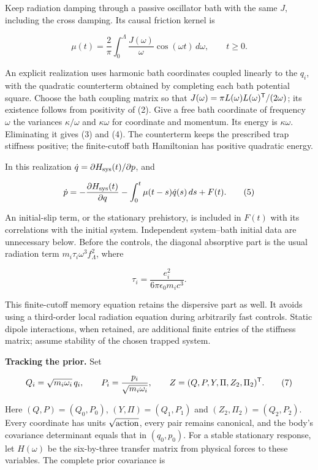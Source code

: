 \documentclass[11pt,a4paper]{article}
\begin{document}
Keep radiation damping through a passive oscillator bath with the same
\(J\), including the cross damping. Its causal friction kernel is

\[\mu(t)=\frac2\pi\int_0^\Lambda
       \frac{J(\omega)}{\omega}\cos(\omega t)\,d\omega,
\qquad t\ge0. \tag{4}\]

An explicit realization uses harmonic bath coordinates coupled linearly
to the \(q_i\), with the quadratic counterterm obtained by completing
each bath potential square. Choose the bath coupling matrix so that
\(J(\omega)=\pi L(\omega)L(\omega)^{\sf T}/(2\omega)\); its existence
follows from positivity of (2). Give a free bath coordinate of frequency
\(\omega\) the variances \(\kappa/\omega\) and \(\kappa\omega\) for
coordinate and momentum. Its energy is \(\kappa\omega\). Eliminating it
gives (3) and (4). The counterterm keeps the prescribed trap stiffness
positive; the finite-cutoff bath Hamiltonian has positive quadratic
energy.

In this realization \(\dot q=\partial H_{\rm sys}(t)/\partial p\), and

\[\dot p=-\frac{\partial H_{\rm sys}(t)}{\partial q}
 -\int_0^t\mu(t-s)\dot q(s)\,ds+F(t). \tag{5}\]

An initial-slip term, or the stationary prehistory, is included in
\(F(t)\) with its correlations with the initial system. Independent
system--bath initial data are unnecessary below. Before the controls,
the diagonal absorptive part is the usual radiation term
\(m_i\tau_i\omega^3 f_\Lambda^2\), where

\[\tau_i=\frac{e_i^2}{6\pi\epsilon_0m_i c^3}.
\tag{6}\]

This finite-cutoff memory equation retains the dispersive part as well.
It avoids using a third-order local radiation equation during
arbitrarily fast controls. Static dipole interactions, when retained,
are additional finite entries of the stiffness matrix; assume stability
of the chosen trapped system.

\textbf{Tracking the prior.} Set

\[Q_i=\sqrt{m_i\omega_i}\,q_i,\qquad
P_i=\frac{p_i}{\sqrt{m_i\omega_i}},\qquad
Z=(Q,P,Y,\Pi,Z_2,\Pi_2)^{\sf T}. \tag{7}\]

Here \((Q,P)=(Q_0,P_0)\), \((Y,\Pi)=(Q_1,P_1)\) and
\((Z_2,\Pi_2)=(Q_2,P_2)\). Every coordinate has units
\(\sqrt{\rm action}\), every pair remains canonical, and the body's
covariance determinant equals that in \((q_0,p_0)\). For a stable
stationary response, let \(H(\omega)\) be the six-by-three transfer
matrix from physical forces to these variables. The complete prior
covariance is
\end{document}
